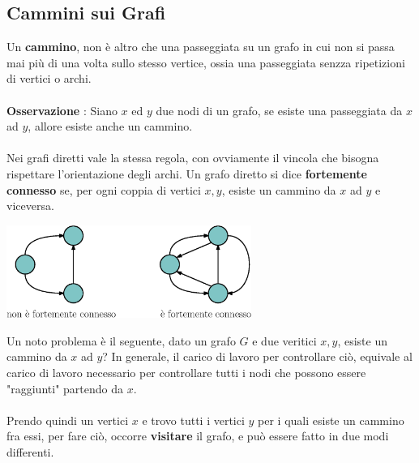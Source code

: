 \documentclass[12pt, letterpaper]{article}
\newcommand{\acc}{\\\hphantom{}\\}
\begin{document}
\subsection{Cammini sui Grafi}
Un \textbf{cammino}, non è altro che una passeggiata su un grafo in cui non 
si passa mai più di una volta sullo stesso vertice, ossia una passeggiata 
senzza ripetizioni di vertici o archi. \acc 
\textbf{Osservazione} : Siano $x$ ed $y$ due nodi di un grafo, se esiste 
una passeggiata da $x$ ad $y$, allore esiste anche un cammino.\acc 
Nei grafi diretti vale la stessa regola, con ovviamente il vincola che bisogna rispettare 
l'orientazione degli archi. Un grafo diretto si dice \textbf{fortemente connesso} 
se, per ogni coppia di vertici \(x,y\), esiste un cammino da \(x\) ad \(y\)
e viceversa. \begin{center}
    \includegraphics[width=0.6\textwidth ]{images/fortConnesso.eps}
\end{center}
Un noto problema è il seguente, dato un grafo \(G\) e due veritici \(x,y\), esiste un cammino da \(x\) ad \(y\)? In generale, 
il carico di lavoro per controllare ciò, equivale al carico di lavoro necessario per controllare tutti i nodi che possono essere 
"raggiunti" partendo da \(x\).\acc 
Prendo quindi un vertici \(x\) e trovo tutti i vertici \(y\) per i quali esiste un cammino fra essi, per fare ciò, occorre 
\textbf{visitare} il grafo, e può essere fatto in due modi differenti.
\end{document}

